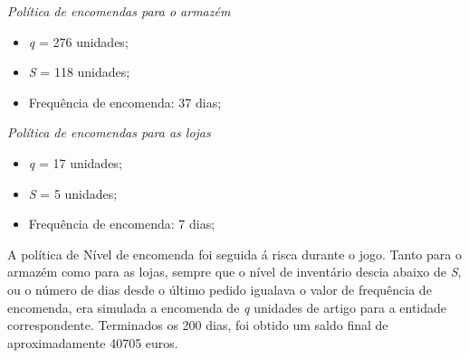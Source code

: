 \begin{itemize}
	\iteam \emph{Política de encomendas para o armazém}
		\begin{itemize}
			\item \emph{q} = 276 unidades;
			\item \emph{S} = 118 unidades;
			\item Frequência de encomenda: 37 dias;
		\end{itemize}
	\iteam \emph{Política de encomendas para as lojas}
		\begin{itemize}
			\item \emph{q} = 17 unidades;
			\item \emph{S} = 5 unidades;
			\item Frequência de encomenda: 7 dias;
		\end{itemize}
\end{itemize}

A política de Nível de encomenda foi seguida á risca durante o jogo. Tanto para o armazém como para as lojas, sempre que o nível de inventário descia abaixo de \emph{S}, ou o número de dias desde o último pedido igualava o valor de frequência de encomenda, era simulada a encomenda de \emph{q} unidades de artigo para a entidade correspondente. Terminados os 200 dias, foi obtido um saldo final de aproximadamente 40705 euros.



